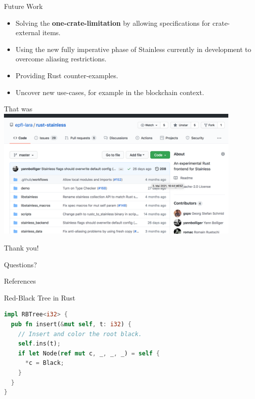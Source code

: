 \begin{frame}{Future Work}
\begin{itemize}
  \item Solving the \textbf{one-crate-limitation} by allowing specifications
  for crate-external items.

  \item Using the new fully imperative phase of Stainless currently in
  development to overcome aliasing restrictions.

  \item Providing Rust counter-examples.

  \item Uncover new use-cases, for example in the blockchain context.
\end{itemize}
\end{frame}

\begin{frame}{That was}
\centering
\includegraphics[width=0.9\textwidth]{img/github.png}
\end{frame}

\begin{frame}[standout]
Thank you!
\end{frame}

\begin{frame}[standout]
Questions?
\end{frame}


\begin{frame}[allowframebreaks]{References}
  
  
\end{frame}


\appendix

\begin{frame}[fragile]{Red-Black Tree in Rust}
\begin{lstlisting}[language=Rust, caption={Insert method}]
impl RBTree<i32> {
  pub fn insert(&mut self, t: i32) {
    // Insert and color the root black.
    self.ins(t);
    if let Node(ref mut c, _, _, _) = self {
      *c = Black;
    }
  }
}
\end{lstlisting}
\end{frame}


